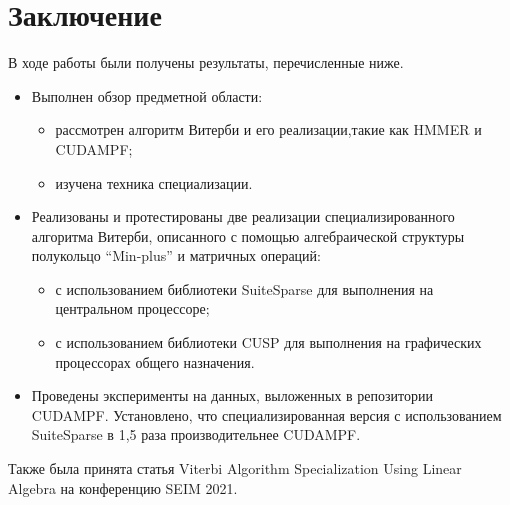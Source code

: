 \section{Заключение}
В ходе работы были получены результаты, перечисленные ниже.
\begin{itemize}
	\item Выполнен обзор предметной области:
		\begin{itemize}
			\item рассмотрен алгоритм Витерби и его реализации,такие как HMMER и CUDAMPF;
			\item изучена техника специализации.
		\end{itemize}
	\item Реализованы и протестированы две реализации специализированного алгоритма Витерби, описанного с помощью алгебраической структуры полукольцо “Min-plus” и матричных операций:
		\begin{itemize}
			\item с использованием библиотеки SuiteSparse для выполнения на центральном процессоре;
			\item с использованием библиотеки CUSP для выполнения на графических процессорах общего назначения.
		\end{itemize}
	\item Проведены эксперименты на данных, выложенных в репозитории CUDAMPF. Установлено, что специализированная версия с использованием SuiteSparse в 1,5 раза производительнее CUDAMPF.
\end{itemize}

Также была принята статья Viterbi Algorithm Specialization Using Linear Algebra на конференцию SEIM 2021.
